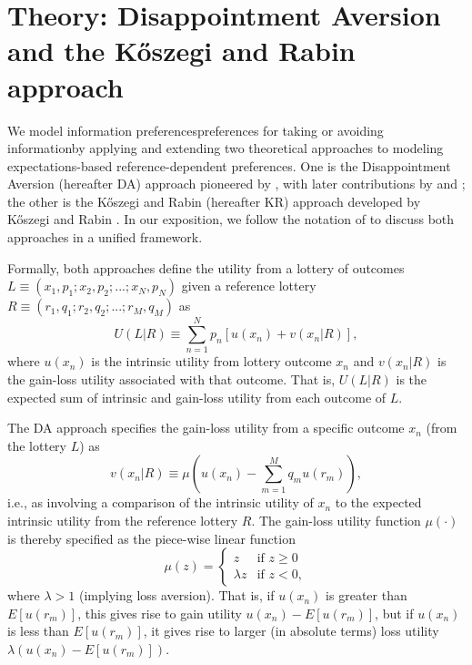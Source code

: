 \documentclass[12pt]{article}
\begin{document}
\section{Theory: Disappointment Aversion and the Kőszegi and Rabin approach}

We model information preferences\textemdash preferences for taking or avoiding information\textemdash by applying and extending two theoretical approaches to modeling expectations-based reference-dependent preferences. One is the Disappointment Aversion (hereafter DA) approach pioneered by \citet{bellDisappointmentDecisionMaking1985}, with later contributions by \citet{loomesDisappointmentDynamicConsistency1986} and \citet{gulTheoryDisappointmentAversion1991}; the other is the Kőszegi and Rabin (hereafter KR) approach developed by Kőszegi and Rabin \citet{koszegiModelReferenceDependentPreferences2006,koszegiReferenceDependentRiskAttitudes2007}. In our exposition, we follow the notation of \citet{odonoghueChapterReferenceDependentPreferences2018} to discuss both approaches in a unified framework.

Formally, both approaches define the utility from a lottery of outcomes $L \equiv (x_1,p_1;x_2,p_2;...;x_N,p_N)$ given a reference lottery $R \equiv (r_1,q_1;r_2,q_2;...;r_M,q_M)$ as
\begin{equation*}
  U(L|R) \equiv \sum_{n=1}^{N} p_n[u(x_n)+v(x_n|R)],
\end{equation*}
where $u(x_n)$ is the intrinsic utility from lottery outcome $x_n$ and $v(x_n|R)$ is the gain-loss utility associated with that outcome. That is, $U(L|R)$ is the expected sum of intrinsic and gain-loss utility from each outcome of $L$.

The DA approach specifies the gain-loss utility from a specific outcome $x_n$ (from the lottery $L$) as
\begin{equation*}
  v(x_n|R) \equiv \mu (u(x_n)-\sum_{m=1}^M q_mu(r_m)),
\end{equation*}
i.e., as involving a comparison of the intrinsic utility of $x_n$ to the expected intrinsic utility from the reference lottery $R$. The gain-loss utility function $\mu(\cdot)$ is thereby specified as the piece-wise linear function
\begin{equation*}
  \mu(z)=
  \begin{cases}
    z          & \text{if } z \geq 0 \\
    \lambda z  & \text{if } z < 0 ,
  \end{cases}
\end{equation*}
where $\lambda>1$ (implying loss aversion). That is, if $u(x_n)$ is greater than $E[u(r_m)]$, this gives rise to gain utility $u(x_n)-E[u(r_m)]$, but if $u(x_n)$ is less than $E[u(r_m)]$, it gives rise to larger (in absolute terms) loss utility $\lambda(u(x_n)-E[u(r_m)])$.
\end{document}
